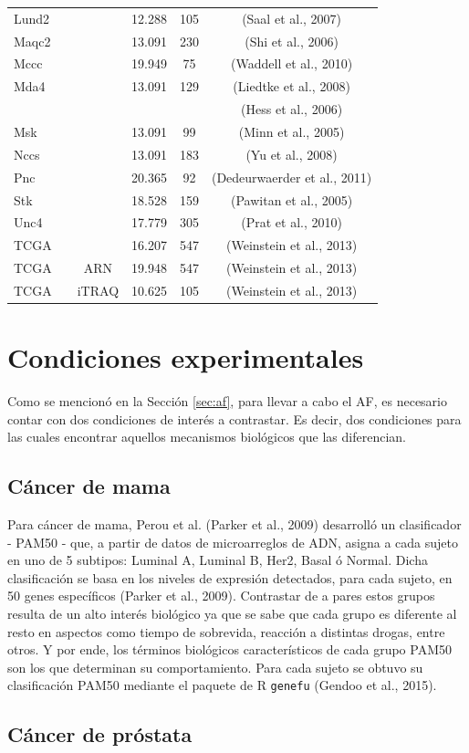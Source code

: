 \documentclass[12pt,twoside]{reedthesis}
\begin{document}
\begin{longtable}[]{@{}lccccc@{}}
Lund2 & & & 12.288 & 105 & (Saal et al., 2007)\tabularnewline
Maqc2 & & & 13.091 & 230 & (Shi et al., 2006)\tabularnewline
Mccc & & & 19.949 & 75 & (Waddell et al., 2010)\tabularnewline
Mda4 & & & 13.091 & 129 & (Liedtke et al., 2008)\tabularnewline
& & & & & (Hess et al., 2006)\tabularnewline
Msk & & & 13.091 & 99 & (Minn et al., 2005)\tabularnewline
Nccs & & & 13.091 & 183 & (Yu et al., 2008)\tabularnewline
Pnc & & & 20.365 & 92 & (Dedeurwaerder et al., 2011)\tabularnewline
Stk & & & 18.528 & 159 & (Pawitan et al., 2005)\tabularnewline
Unc4 & & & 17.779 & 305 & (Prat et al., 2010)\tabularnewline
TCGA & & & 16.207 & 547 & (Weinstein et al., 2013)\tabularnewline
TCGA & & ARN & 19.948 & 547 & (Weinstein et al., 2013)\tabularnewline
TCGA & & iTRAQ & 10.625 & 105 & (Weinstein et al., 2013)\tabularnewline
\bottomrule
\end{longtable}
\hypertarget{condiciones-experimentales}{%
\section{Condiciones experimentales}\label{condiciones-experimentales}}

Como se mencionó en la Sección \ref{sec:af}, para llevar a cabo el AF, es necesario contar con dos condiciones de interés a contrastar. Es decir, dos condiciones para las cuales encontrar aquellos mecanismos biológicos que las diferencian.

\hypertarget{sec:bcSubt}{%
\subsection{Cáncer de mama}\label{sec:bcSubt}}

Para cáncer de mama, Perou et al. (Parker et al., 2009) desarrolló un clasificador - PAM50 - que, a partir de datos de microarreglos de ADN, asigna a cada sujeto en uno de 5 subtipos: Luminal A, Luminal B, Her2, Basal ó Normal. Dicha clasificación se basa en los niveles de expresión detectados, para cada sujeto, en 50 genes específicos (Parker et al., 2009). Contrastar de a pares estos grupos resulta de un alto interés biológico ya que se sabe que cada grupo es diferente al resto en aspectos como tiempo de sobrevida, reacción a distintas drogas, entre otros. Y por ende, los términos biológicos característicos de cada grupo PAM50 son los que determinan su comportamiento. Para cada sujeto se obtuvo su clasificación PAM50 mediante el paquete de R \texttt{genefu} (Gendoo et al., 2015).

\hypertarget{cuxe1ncer-de-pruxf3stata}{%
\subsection{Cáncer de próstata}\label{cuxe1ncer-de-pruxf3stata}}
\end{document}
